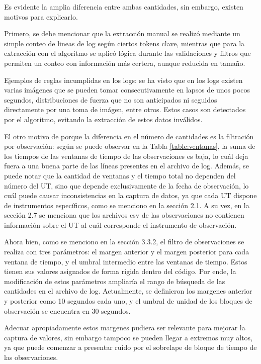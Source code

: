 Es evidente la amplia diferencia entre ambas cantidades, sin embargo, existen motivos para explicarlo.

Primero, se debe mencionar que la extracción manual se realizó mediante un simple conteo de lineas de log según ciertos tokens clave, mientras que para la extracción con el algoritmo se aplicó lógica durante las validaciones y filtros que permiten un conteo con información más certera, aunque reducida en tamaño.

Ejemplos de reglas incumplidas en los logs: se ha visto que en los logs existen varias imágenes que se pueden tomar consecutivamente en lapsos de unos pocos segundos, distribuciones de fuerza que no son anticipados ni seguidos directamente por una toma de imágen, entre otros. Estos casos son detectados por el algoritmo, evitando la extracción de estos datos inválidos.

El otro motivo de porque la diferencia en el número de cantidades es la filtración por observación: según se puede observar en la Tabla \ref{table:ventanas}, la suma de los tiempos de las ventanas de tiempo de las observaciones es baja, lo cuál deja fuera a una buena parte de las líneas presentes en el archivo de log. Además, se puede notar que la cantidad de ventanas y el tiempo total no dependen del número del UT, sino que depende exclusivamente de la fecha de observación, lo cuál puede causar inconsistencias en la captura de datos, ya que cada UT dispone de instrumentos específicos, como se menciono en la sección 2.1. A su vez, en la sección 2.7 se menciona que los archivos csv de las observaciones no contienen información sobre el UT al cuál corresponde el instrumento de observación. 

Ahora bien, como se menciono en la sección 3.3.2, el filtro de observaciones se realiza con tres parámetros: el margen anterior y el margen posterior para cada ventana de tiempo, y el umbral intermedio entre las ventanas de tiempo. Estos tienen sus valores asignados de forma rígida dentro del código. Por ende, la modificación de estos parámetros ampliaría el rango de búsqueda de las cantidades en el archivo de log. Actualmente, se definieron los margenes anterior y posterior como 10 segundos cada uno, y el umbral de unidad de los bloques de observación se encuentra en 30 segundos.

Adecuar apropiadamente estos margenes pudiera ser relevante para mejorar la captura de valores, sin embargo tampoco se pueden llegar a extremos muy altos, ya que puede comenzar a presentar ruido por el sobrelape de bloque de tiempo de las observaciones.

